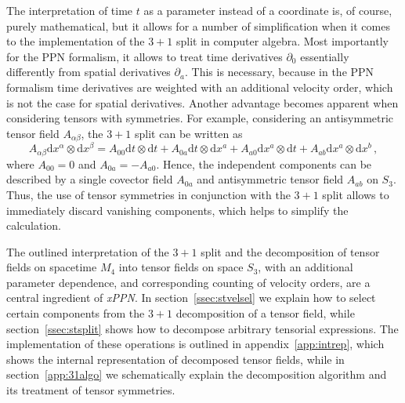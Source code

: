 \documentclass[notitlepage,a4paper,aps,prd,onecolumn,superscriptaddress,nofootinbib,groupedaddress,longbibliography]{revtex4-1}
\newcommand{\dd}{\mathrm{d}}
\newcommand{\xPPN}{\emph{xPPN}}
\begin{document}
The interpretation of time \(t\) as a parameter instead of a coordinate is, of course, purely mathematical, but it allows for a number of simplification when it comes to the implementation of the $3+1$ split in computer algebra. Most importantly for the PPN formalism, it allows to treat time derivatives \(\partial_0\) essentially differently from spatial derivatives \(\partial_a\). This is necessary, because in the PPN formalism time derivatives are weighted with an additional velocity order, which is not the case for spatial derivatives. Another advantage becomes apparent when considering tensors with symmetries. For example, considering an antisymmetric tensor field \(A_{\alpha\beta}\), the $3+1$ split can be written as
\begin{equation}
A_{\alpha\beta}\dd x^{\alpha} \otimes \dd x^{\beta} = A_{00}\dd t \otimes \dd t + A_{0a}\dd t \otimes \dd x^a + A_{a0}\dd x^a \otimes \dd t + A_{ab}\dd x^a \otimes \dd x^b\,,
\end{equation}
where \(A_{00} = 0\) and \(A_{0a} = -A_{a0}\). Hence, the independent components can be described by a single covector field \(A_{0a}\) and antisymmetric tensor field \(A_{ab}\) on \(S_3\). Thus, the use of tensor symmetries in conjunction with the $3+1$ split allows to immediately discard vanishing components, which helps to simplify the calculation.

The outlined interpretation of the $3+1$ split and the decomposition of tensor fields on spacetime \(M_4\) into tensor fields on space \(S_3\), with an additional parameter dependence, and corresponding counting of velocity orders, are a central ingredient of \xPPN. In section~\ref{ssec:stvelsel} we explain how to select certain components from the $3+1$ decomposition of a tensor field, while section~\ref{ssec:stsplit} shows how to decompose arbitrary tensorial expressions. The implementation of these operations is outlined in appendix~\ref{app:intrep}, which shows the internal representation of decomposed tensor fields, while in section~\ref{app:31algo} we schematically explain the decomposition algorithm and its treatment of tensor symmetries.
\end{document}
